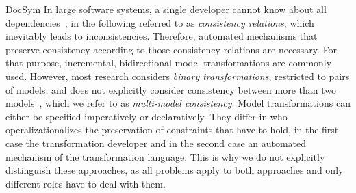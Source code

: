 \begin{copiedFrom}{DocSym}
In large software systems, a single developer cannot know about all dependencies~\cite{petrenko2008a}, %
in the following referred to as \emph{consistency relations}, which inevitably leads to inconsistencies. 
Therefore, automated mechanisms that preserve consistency according to those consistency relations are necessary. 
For that purpose, incremental, bidirectional model transformations %
are commonly used. However, most research considers \emph{binary transformations}, restricted to pairs of models, and does not explicitly consider consistency between more than two models~\cite{stevens2017a}, which we refer to as \emph{multi-model consistency}.
Model transformations can either be specified imperatively or declaratively. They differ in who operalizationalizes the preservation of constraints that have to hold, in the first case the transformation developer and in the second case an automated mechanism of the transformation language. This is why we do not explicitly distinguish these approaches, as all problems apply to both approaches and only different roles have to deal with them. 


\end{copiedFrom}
